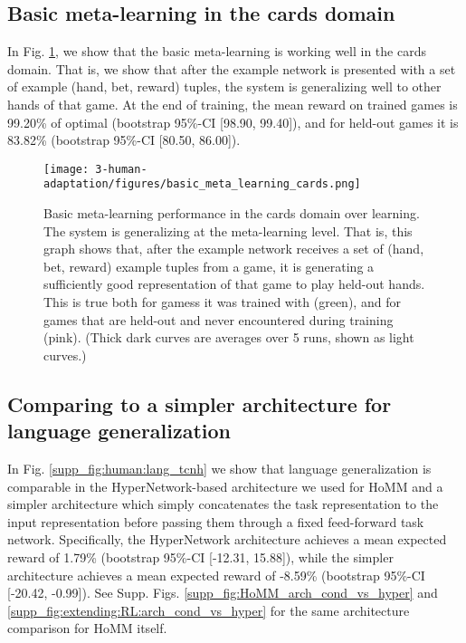 \subsection{Basic meta-learning in the cards domain}

In Fig. \ref{supp_fig:human:cards_basic_meta_learning}, we show that the basic meta-learning is working well in the cards domain. That is, we show that after the example network is presented with a set of example (hand, bet, reward) tuples, the system is generalizing well to other hands of that game. At the end of training, the mean reward on trained games is 99.20\% of optimal (bootstrap 95\%-CI [98.90, 99.40]), and for held-out games it is 83.82\% (bootstrap 95\%-CI [80.50, 86.00]).
\begin{figure}[H]
\centering
\texttt{[image: 3-human-adaptation/figures/basic\_meta\_learning\_cards.png]}
\caption[Basic meta-learning performance in the cards domain over learning.]{Basic meta-learning performance in the cards domain over learning. The system is generalizing at the meta-learning level. That is, this graph shows that, after the example network receives a set of (hand, bet, reward) example tuples from a game, it is generating a sufficiently good representation of that game to play held-out hands. This is true both for gamess it was trained with (green), and for games that are held-out and never encountered during training (pink). (Thick dark curves are averages over 5 runs, shown as light curves.)} \label{supp_fig:human:cards_basic_meta_learning}
\end{figure}

\subsection{Comparing to a simpler architecture for language generalization}\label{appendix:human:lang_tcnh}
In Fig. \ref{supp_fig:human:lang_tcnh} we show that language generalization is comparable in the HyperNetwork-based architecture we used for HoMM and a simpler architecture which simply concatenates the task representation to the input representation before passing them through a fixed feed-forward task network. Specifically, the HyperNetwork architecture achieves a mean expected reward of 1.79\% (bootstrap 95\%-CI [-12.31, 15.88]), while the simpler architecture achieves a mean expected reward of -8.59\% (bootstrap 95\%-CI [-20.42, -0.99]). See Supp. Figs. \ref{supp_fig:HoMM_arch_cond_vs_hyper} and \ref{supp_fig:extending:RL:arch_cond_vs_hyper} for the same architecture comparison for HoMM itself.  

